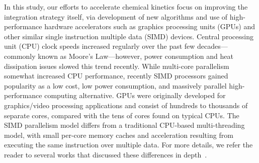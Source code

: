 \documentclass[preprint]{elsarticle}
\begin{document}
In this study, our efforts to accelerate chemical kinetics focus on improving the integration strategy itself, via development of new algorithms and use of high-performance hardware accelerators such as graphics processing units (GPUs) and other similar single instruction multiple data (SIMD) devices.
Central processing unit (CPU) clock speeds increased regularly over the past few decades---commonly known as Moore's Law---however, power consumption and heat dissipation issues slowed this trend recently.
While multi-core parallelism somewhat increased CPU performance, recently SIMD processors gained popularity as a low cost, low power consumption, and massively parallel high-performance computing alternative.
GPUs were originally developed for graphics\slash video processing applications and consist of hundreds to thousands of separate cores, compared with the tens of cores found on typical CPUs.
The SIMD parallelism model differs from a traditional CPU-based multi-threading model, with small per-core memory caches and acceleration resulting from executing the same instruction over multiple data.
For more details, we refer the reader to several works that discussed these differences in depth~\cite{Cruz:2011gc,Brodtkorb:2013hn,Niemeyer:2014hn}.
\end{document}
